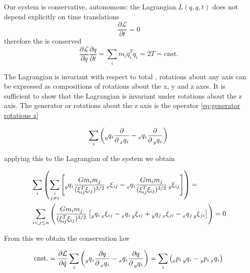 \documentclass[12pt]{article}
\begin{document}
Our system is conservative, autonomous: the Lagrangian $L(q,\dot q,t)$ does not depend explicitly on time translations
$$\frac{\partial\mathcal L}{\partial t} = 0$$
therefore the  is conserved
\begin{equation}\label{eq:conservation of energy noether}
\frac{\partial\mathcal L}{\partial \dot q}\frac{\partial q}{\partial t} = \sum_i m_i\dot q_i^T \dot q_i = 2T = \text{cnst.}\end{equation}

The Lagrangian is invariant with respect to total , rotations about any axis can be expressed as compositions of rotations about the x, y and z axes. It is sufficient to show that the Lagrangian is invariant under rotations about the z axis. The generator or rotations about the z axis is the operator \eqref{eq:generator rotations z}

\begin{equation}\label{eq:generator rotations z}
    \sum_i \left(\prescript{}{y}{q}_i \frac{\partial}{\partial \prescript{}{x}{q}_i} - \prescript{}{x}{q}_i \frac{\partial}{\partial \prescript{}{y}{q}_i} \right)
\end{equation}

applying this to the Lagrangian of the system we obtain

\begin{equation}\label{eq:rotate lagrangian}
\begin{split}
&   \sum_i\left(
    \sum_{\stackrel{j}{j\neq i}}\left[
    \prescript{}{y}{q}_i \frac{Gm_im_j}{(\xi_{ij}^T\xi_{ij})^{3/2}}\prescript{}{x}{\xi}_{ij} - \prescript{}{x}{q}_i \frac{Gm_im_j}{(\xi_{ij}^T\xi_{ij})^{3/2}} \prescript{}{y}{\xi}_{ij}
    \right]\right)
    =\\
&   \sum_{i<j\leq n}\left(
    \frac{Gm_im_j}{(\xi_{ij}^T\xi_{ij})^{3/2}} \left[
    \prescript{}{y}{q}_i \prescript{}{x}{\xi}_{ij} - \prescript{}{x}{q}_i \prescript{}{y}{\xi}_{ij} + \prescript{}{y}{q}_j \prescript{}{x}{\xi}_{ji} - \prescript{}{x}{q}_j \prescript{}{y}{\xi}_{ji}
    \right]\right) = 0
\end{split}
\end{equation}

From this we obtain the conservation law 

\begin{equation}\label{eq:conservation of z angular momentum}
    \text{cnst.} = \frac{\partial\mathcal L}{\partial \dot q}\sum_i \left( \prescript{}{y}{q}_i \frac{\partial q}{\partial \prescript{}{x}{q}_i} - \prescript{}{x}{q}_i \frac{\partial q}{\partial \prescript{}{y}{q}_i} \right)
    =
    \sum_i \left( \prescript{}{x}{p}_i\prescript{}{y}{q}_i - \prescript{}{y}{p}_i \prescript{}{x}{q}_i \right)
\end{equation}
\end{document}
